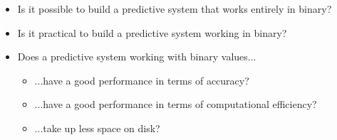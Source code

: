 \begin{itemize}
  \item Is it possible to build a predictive system that works entirely in binary?
  \item Is it practical to build a predictive system working in binary?
  \item Does a predictive system working with binary values...
    \begin{itemize}
      \item ...have a good performance in terms of accuracy?
      \item ...have a good performance in terms of computational efficiency?
      \item ...take up less space on disk?
    \end{itemize}
\end{itemize}
